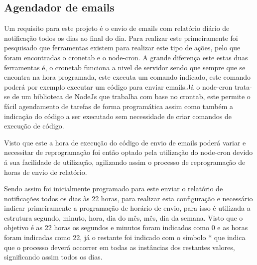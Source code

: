 \subsection{Agendador de emails}

Um requisito para este projeto é o envio de emails com relatório diário de notificação todos os dias ao final do dia. Para realizar este primeiramente foi pesquisado que ferramentas existem para realizar este tipo de ações, pelo que foram encontradas o cronetab e o node-cron. A grande diferença este estas duas ferramentas é, o cronetab funciona a nivel de servidor sendo que sempre que se encontra na hora programada, este executa um comando indicado, este comando poderá por exemplo executar um código para enviar emails.Já o node-cron trata-se de um biblioteca de NodeJs que trabalha com base no crontab, este permite o fácil agendamento de tarefas de forma programática assim como também a indicação do código a ser executado 
sem necessidade de criar comandos de execução de código.

Visto que este a hora de execução do código de envio de emails poderá variar e necessitar de reprogramação foi então optado pela utilização do node-cron devido á sua facilidade de utilização, agilizando assim o processo de reprogramação de horas de envio de relatório.

Sendo assim foi inicialmente programado para este enviar o relatório de notificações todos os dias às 22 horas, para realizar esta configuração e necessário indicar primeiramente a programação de horário de envio, para isso é utilizada a estrutura segundo, minuto, hora, dia do mês, mês, dia da semana. Visto que o objetivo é as 22 horas os segundos e minutos foram indicados como 0 e as horas foram indicadas como 22, já o restante foi indicado com o símbolo * que indica que o processo deverá occorrer em todas as instâncias dos restantes valores, significando assim todos os dias.